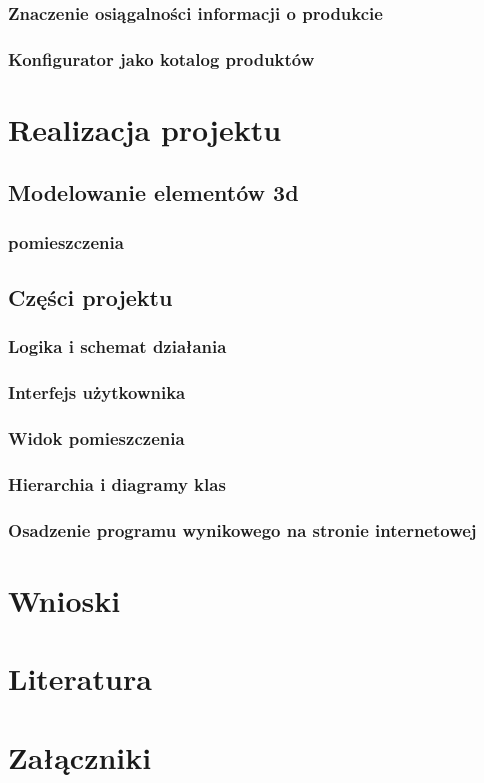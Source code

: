 \documentclass{article} %
\begin{document}
        \subsubsection{Znaczenie osiągalności informacji o produkcie}
        \subsubsection{Konfigurator jako kotalog produktów}
\section{Realizacja projektu}
    \subsection{Modelowanie elementów 3d}
        \subsubsection{pomieszczenia}
    \subsection{Części projektu}
        \subsubsection{Logika i schemat działania}
        \subsubsection{Interfejs użytkownika}
        \subsubsection{Widok pomieszczenia}
        \subsubsection{Hierarchia i diagramy klas}
        \subsubsection{Osadzenie programu wynikowego na stronie internetowej}



\section{Wnioski}


\newpage
\section{Literatura}

\newpage
\section{Załączniki}
\end{document}
